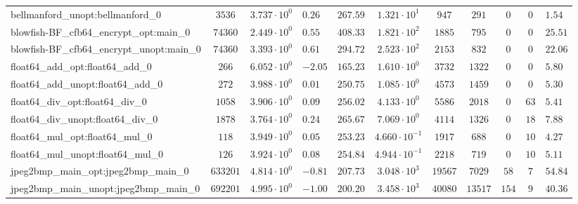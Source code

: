\begin{tabular}{|l|c|HHc|c|c|c|c|cH|}
bellmanford\_unopt:bellmanford\_0               & $ 3536     $ & $ 3.737 \cdot 10^{0} $ & $ 0.26  $ & $ 267.59 $ & $ 1.321 \cdot 10^{1}  $ & $ 947    $ & $ 291   $ & $ 0   $ & $ 0   $ & $ 1.54    $ \\
blowfish-BF\_cfb64\_encrypt\_opt:main\_0        & $ 74360    $ & $ 2.449 \cdot 10^{0} $ & $ 0.55  $ & $ 408.33 $ & $ 1.821 \cdot 10^{2}  $ & $ 1885   $ & $ 795   $ & $ 0   $ & $ 0   $ & $ 25.51   $ \\
blowfish-BF\_cfb64\_encrypt\_unopt:main\_0      & $ 74360    $ & $ 3.393 \cdot 10^{0} $ & $ 0.61  $ & $ 294.72 $ & $ 2.523 \cdot 10^{2}  $ & $ 2153   $ & $ 832   $ & $ 0   $ & $ 0   $ & $ 22.06   $ \\
float64\_add\_opt:float64\_add\_0               & $ 266      $ & $ 6.052 \cdot 10^{0} $ & $ -2.05 $ & $ 165.23 $ & $ 1.610 \cdot 10^{0}  $ & $ 3732   $ & $ 1322  $ & $ 0   $ & $ 0   $ & $ 5.80    $ \\
float64\_add\_unopt:float64\_add\_0             & $ 272      $ & $ 3.988 \cdot 10^{0} $ & $ 0.01  $ & $ 250.75 $ & $ 1.085 \cdot 10^{0}  $ & $ 4573   $ & $ 1459  $ & $ 0   $ & $ 0   $ & $ 5.30    $ \\
float64\_div\_opt:float64\_div\_0               & $ 1058     $ & $ 3.906 \cdot 10^{0} $ & $ 0.09  $ & $ 256.02 $ & $ 4.133 \cdot 10^{0}  $ & $ 5586   $ & $ 2018  $ & $ 0   $ & $ 63  $ & $ 5.41    $ \\
float64\_div\_unopt:float64\_div\_0             & $ 1878     $ & $ 3.764 \cdot 10^{0} $ & $ 0.24  $ & $ 265.67 $ & $ 7.069 \cdot 10^{0}  $ & $ 4114   $ & $ 1326  $ & $ 0   $ & $ 18  $ & $ 7.88    $ \\
float64\_mul\_opt:float64\_mul\_0               & $ 118      $ & $ 3.949 \cdot 10^{0} $ & $ 0.05  $ & $ 253.23 $ & $ 4.660 \cdot 10^{-1} $ & $ 1917   $ & $ 688   $ & $ 0   $ & $ 10  $ & $ 4.27    $ \\
float64\_mul\_unopt:float64\_mul\_0             & $ 126      $ & $ 3.924 \cdot 10^{0} $ & $ 0.08  $ & $ 254.84 $ & $ 4.944 \cdot 10^{-1} $ & $ 2218   $ & $ 719   $ & $ 0   $ & $ 10  $ & $ 5.11    $ \\
jpeg2bmp\_main\_opt:jpeg2bmp\_main\_0           & $ 633201   $ & $ 4.814 \cdot 10^{0} $ & $ -0.81 $ & $ 207.73 $ & $ 3.048 \cdot 10^{3}  $ & $ 19567  $ & $ 7029  $ & $ 58  $ & $ 7   $ & $ 54.84   $ \\
jpeg2bmp\_main\_unopt:jpeg2bmp\_main\_0         & $ 692201   $ & $ 4.995 \cdot 10^{0} $ & $ -1.00 $ & $ 200.20 $ & $ 3.458 \cdot 10^{3}  $ & $ 40080  $ & $ 13517 $ & $ 154 $ & $ 9   $ & $ 40.36   $ \\

\end{tabular}
